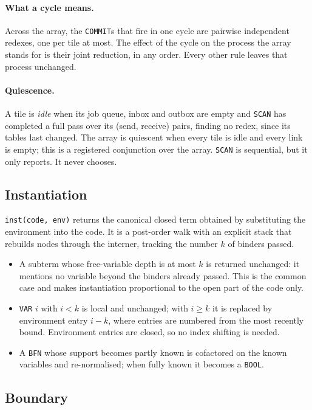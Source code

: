 \documentclass[10.5pt,a4paper]{extarticle}
\newcommand{\kw}[1]{\texttt{#1}}
\theoremstyle{definition}
\theoremstyle{remark}
\begin{document}
\paragraph{What a cycle means.} Across the array, the \kw{COMMIT}s that fire
in one cycle are pairwise independent redexes, one per tile at most. The
effect of the cycle on the process the array stands for is their joint
reduction, in any order. Every other rule leaves that process unchanged.

\paragraph{Quiescence.} A tile is \emph{idle} when its job queue, inbox and
outbox are empty and \kw{SCAN} has completed a full pass over its (send,
receive) pairs, finding no redex, since its tables last changed. The array is
quiescent when every tile is idle and every link is empty; this is a
registered conjunction over the array. \kw{SCAN} is sequential, but it only
reports. It never chooses.

\subsection{Instantiation}\label{sec:inst}

\kw{inst(code, env)} returns the canonical closed term obtained by
substituting the environment into the code. It is a post-order walk with an
explicit stack that rebuilds nodes through the interner, tracking the number
$k$ of binders passed.
\begin{itemize}
\item A subterm whose free-variable depth is at most $k$ is returned
unchanged: it mentions no variable beyond the binders already passed. This is
the common case and makes instantiation proportional to the open part of the
code only.
\item \kw{VAR} $i$ with $i<k$ is local and unchanged; with $i \ge k$ it is
replaced by environment entry $i-k$, where entries are numbered from the most
recently bound. Environment entries are closed, so no index shifting is needed.
\item A \kw{BFN} whose support becomes partly known is cofactored on the
known variables and re-normalised; when fully known it becomes a \kw{BOOL}.
\end{itemize}

\subsection{Boundary}\label{sec:boundary}
\end{document}
